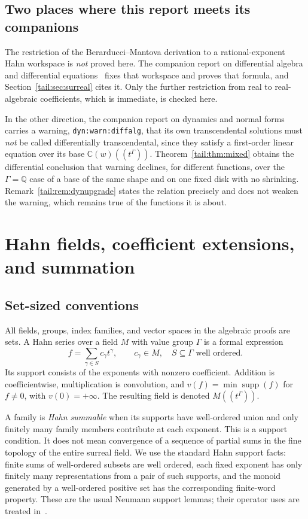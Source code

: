 \documentclass[11pt,a4paper]{article}
\numberwithin{equation}{section}
\theoremstyle{definition}
\theoremstyle{remark}
\newcommand{\C}{\mathbb C}
\newcommand{\Q}{\mathbb Q}
\newcommand{\supp}{\operatorname{supp}}
\begin{document}
\subsection{Two places where this report meets its companions}
The restriction of the Berarducci--Mantova derivation to a
rational-exponent Hahn workspace is \emph{not} proved here. The companion
report on differential algebra and differential equations~\cite{RepoDiffEq}
fixes that workspace and proves that formula, and
Section~\ref{tail:sec:surreal} cites it. Only the further restriction from
real to real-algebraic coefficients, which is immediate, is checked here.

In the other direction, the companion report on dynamics and normal
forms~\cite{RepoDyn} carries a warning, \texttt{dyn:warn:diffalg}, that its
own transcendental solutions must \emph{not} be called differentially
transcendental, since they satisfy a first-order linear equation over its
base $\C(w)((t^\Gamma))$. Theorem~\ref{tail:thm:mixed} obtains the
differential conclusion that warning declines, for different functions,
over the $\Gamma=\Q$ case of a base of the same shape and on one fixed
disk with no shrinking. Remark~\ref{tail:rem:dynupgrade} states the
relation precisely and does not weaken the warning, which remains true of
the functions it is about.

\section{Hahn fields, coefficient extensions, and summation}\label{tail:sec:hahn}

\subsection{Set-sized conventions}
All fields, groups, index families, and vector spaces in the algebraic
proofs are sets. A Hahn series over a field $M$ with value group $\Gamma$
is a formal expression
\[
 f=\sum_{\gamma\in S}c_\gamma t^\gamma,
 \qquad c_\gamma\in M,\quad S\subseteq\Gamma\text{ well ordered}.
\]
Its support consists of the exponents with nonzero coefficient. Addition
is coefficientwise, multiplication is convolution, and
$v(f)=\min\supp(f)$ for $f\ne0$, with $v(0)=+\infty$.
The resulting field is denoted $M((t^\Gamma))$.

A family is \emph{Hahn summable} when its supports have well-ordered union
and only finitely many family members contribute at each exponent. This
is a support condition. It does not mean convergence of a sequence of
partial sums in the fine topology of the entire surreal field.
We use the standard Hahn support facts: finite sums of well-ordered
subsets are well ordered, each fixed exponent has only finitely many
representations from a pair of such supports, and the monoid generated
by a well-ordered positive set has the corresponding finite-word
property. These are the usual Neumann support lemmas; their operator
uses are treated in~\cite{vdH}.
\end{document}
